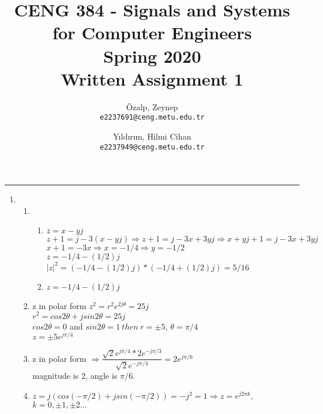 \documentclass[10pt,a4paper, margin=1in]{article}
\author{
  Özalp, Zeynep\\
  \texttt{e2237691@ceng.metu.edu.tr}
  \and
  Yıldırım, Hilmi Cihan\\
  \texttt{e2237949@ceng.metu.edu.tr}
}
\title{CENG 384 - Signals and Systems for Computer Engineers \\
Spring 2020 \\
Written Assignment 1}
\begin{document}
\maketitle



\noindent\rule{19cm}{1.2pt}

\begin{enumerate}

\item 
    \begin{enumerate}
    \item %
    \begin{enumerate}
    \item $\overline{z}=x-yj$ \\
    $z+1=j-3(x-yj) \Rightarrow z+1=j-3x+3yj \Rightarrow x+yj+1=j-3x+3yj$ \\
    $x+1=-3x \Rightarrow x=-1/4 \Rightarrow y=-1/2$ \\
    $z=-1/4-(1/2)j$\\
    $|z|^2=(-1/4-(1/2)j)*(-1/4+(1/2)j)=5/16$\\
    \item $z=-1/4-(1/2)j$\\
    \end{enumerate}
    \item %
    z in polar form $z^2=r^2e^{2j\theta}=25j$ \\
    $r^2=cos2\theta+jsin2\theta=25j$ \\
    $cos2\theta=0$ and $sin2\theta=1\ then\ r=\pm5$, $\theta=\pi/4$\\
    $z=\pm5e^{j\pi/4}$
    \item %
   	z in polar form $\Rightarrow \dfrac{\sqrt{2}e^{j\pi/4}*2e^{-j\pi/3}}{\sqrt{2}e^{-j\pi/4}}=2e^{j\pi/6}$\\
   	magnitude is 2, angle is $\pi/6$.
    \item %
    $z=j(cos(-\pi/2)+jsin(-\pi/2))=-j^2=1 \Rightarrow z=e^{j2\pi k}$, $k=0,\pm1,\pm2...$
    \end{enumerate}



\end{enumerate}
\end{document}
